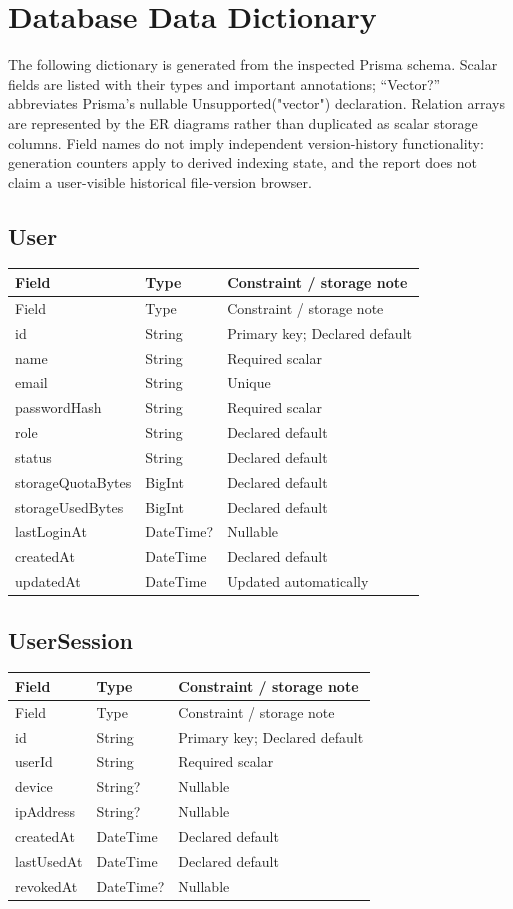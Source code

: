 \documentclass[11pt,a4paper,oneside]{report}
\begin{document}
\chapter{Database Data Dictionary}
The following dictionary is generated from the inspected Prisma schema. Scalar fields are listed with their types and important annotations; ``Vector?'' abbreviates Prisma's nullable Unsupported("vector") declaration. Relation arrays are represented by the ER diagrams rather than duplicated as scalar storage columns. Field names do not imply independent version-history functionality: generation counters apply to derived indexing state, and the report does not claim a user-visible historical file-version browser.

\section{User}
\begin{longtable}{p{.31\linewidth}p{.23\linewidth}p{.36\linewidth}}\toprule Field&Type&Constraint / storage note\\\midrule\endfirsthead\toprule Field&Type&Constraint / storage note\\\midrule\endhead
id&String&Primary key; Declared default\\
name&String&Required scalar\\
email&String&Unique\\
passwordHash&String&Required scalar\\
role&String&Declared default\\
status&String&Declared default\\
storageQuotaBytes&BigInt&Declared default\\
storageUsedBytes&BigInt&Declared default\\
lastLoginAt&DateTime?&Nullable\\
createdAt&DateTime&Declared default\\
updatedAt&DateTime&Updated automatically\\
\bottomrule\end{longtable}

\section{UserSession}
\begin{longtable}{p{.31\linewidth}p{.23\linewidth}p{.36\linewidth}}\toprule Field&Type&Constraint / storage note\\\midrule\endfirsthead\toprule Field&Type&Constraint / storage note\\\midrule\endhead
id&String&Primary key; Declared default\\
userId&String&Required scalar\\
device&String?&Nullable\\
ipAddress&String?&Nullable\\
createdAt&DateTime&Declared default\\
lastUsedAt&DateTime&Declared default\\
revokedAt&DateTime?&Nullable\\
\bottomrule\end{longtable}
\end{document}
